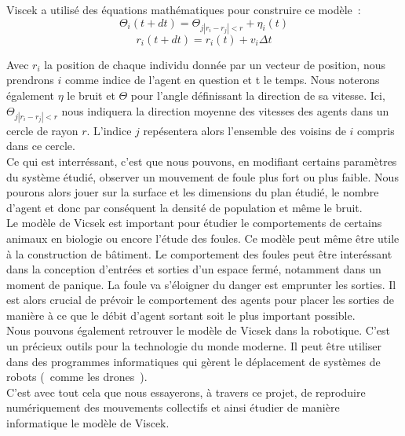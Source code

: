 \documentclass[french, a4paper, 12pt]{article}
\begin{document}
      \newpage
      
      Viscek a utilisé des équations mathématiques pour construire ce modèle~:
      \[
		\Theta_{i}(t+dt) = \Theta_{j |r_{i}-r_{j}|<r} + \eta_{i}(t)
	   \]
	   \[
		 r_{i}(t+dt) = r_{i}(t) + v_{i}\Delta t
	   \]
	
	
      Avec $r_{i}$ la position de chaque individu donnée par un vecteur de position, nous prendrons $i$ comme indice de l'agent en question et t le temps. Nous noterons également $\eta$ le bruit et $\Theta$ pour l’angle définissant la direction de sa vitesse. Ici, $\Theta_{j |r_{i}-r_{j}|<r}$ nous indiquera la direction moyenne des vitesses des agents dans un cercle de rayon $r$. L'indice $j$ repésentera alors l'ensemble des voisins de $i$ compris dans ce cercle.\\
      
      Ce qui est interréssant, c'est que nous pouvons, en modifiant certains paramètres du système étudié, observer un mouvement de foule plus fort ou plus faible. Nous pourons alors jouer sur la surface et les dimensions du plan étudié, le nombre d'agent et donc par conséquent la densité de population et même le bruit.\\

      Le modèle de Vicsek est important pour étudier le comportements de certains animaux en biologie ou encore l'étude des foules. Ce modèle peut même être utile à la construction de bâtiment. Le comportement des foules peut être interéssant dans la conception d'entrées et sorties d'un espace fermé, notamment dans un moment de panique. La foule va s'éloigner du danger est emprunter les sorties. Il est alors crucial de prévoir le comportement des agents pour placer les sorties de manière à ce que le débit d'agent sortant soit le plus important possible.\\
      
      Nous pouvons également retrouver le modèle de Vicsek dans la robotique. C'est un précieux outils pour la technologie du monde moderne. Il peut être utiliser dans des programmes informatiques qui gèrent le déplacement de systèmes de robots (~comme les drones~).\\ 
      
      C'est avec tout cela que nous essayerons, à travers ce projet, de reproduire numériquement des mouvements collectifs et ainsi étudier de manière informatique le modèle de Viscek.
\end{document}
